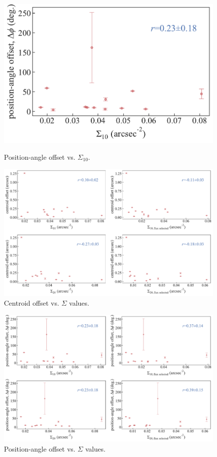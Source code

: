 \documentclass{aa}
\begin{document}
\begin{figure}
    \resizebox{\hsize}{!}    {\includegraphics{paper/figures/position_angle_offset_vs_Sigma_10.pdf}}
    \caption{\label{fig:pos_off_Sigma_all}Position-angle offset vs. $\Sigma_{10}$.}
\end{figure}

\begin{figure}
    \centering
    \includegraphics[width=\textwidth]{paper/figures/centroid_offset_vs_Sigma_all.pdf}    \caption{\label{fig:cent_off_Sigma_all}Centroid offset vs. $\Sigma$ values.}
\end{figure}

\begin{figure}
    \centering
    \includegraphics[width=\textwidth]{paper/figures/position_angle_offset_vs_Sigma_all.pdf}
    \caption{\label{fig:pos_off_Sigma_all}Position-angle offset vs. $\Sigma$ values.}
\end{figure}
\end{document}
